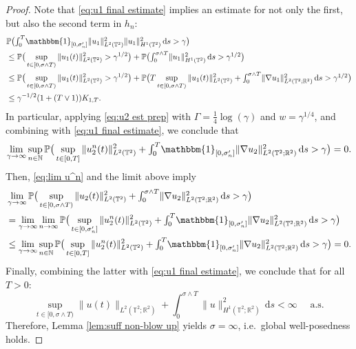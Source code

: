 \documentclass{amsart}
\newcommand{\dd}{\,\mathrm{d}}
\newcommand{\one}{\mathbbm{1}}
\newcommand{\<}{\langle}
\newcommand{\?}{\rangle}
\newcommand{\Tor}{\mathbb{T}}
\renewcommand{\Tor}{\mathbb{T}^2}
\theoremstyle{plain}
\theoremstyle{remark}
\theoremstyle{plain}
\numberwithin{equation}{section}
\def\N{{\mathbb N}}
\def\R{{\mathbb R}}
\renewcommand{\P}{\mathbb{P}}
\begin{document}
\begin{proof}
Note that \eqref{eq:u1 final estimate} implies an estimate for not only the first, but also  the second  term in $h_n$:  
\begin{align*}
&\P\big(\textstyle{\int_0^T}\one_{[0,\sigma_n']}\|u_1\|_{L^2(\Tor)}^2\| u_1\|_{H^1(\Tor )}^2\dd s>\gamma\big)\\
&\leq \P\big(\sup_{t\in[0,\sigma\wedge T)}\|u_1(t)\|_{L^2(\Tor)}^2 >\gamma^{1/2}\big)+\P\big(\textstyle{\int_0^{\sigma\wedge T}}\| u_1\|_{H^1(\Tor)}^2 \dd s>\gamma^{1/2}\big)\\
&\leq \P\big(\sup_{t\in[0,\sigma\wedge T)}\|u_1(t)\|_{L^2(\Tor)}^2 >\gamma^{1/2}\big)+\P\big(T\sup_{t\in[0,\sigma\wedge T)}\|u_1(t)\|_{L^2(\Tor)}^2 +\textstyle{\int_0^{\sigma\wedge T}}\|\nabla u_1\|_{L^2(\Tor;\R^2)}^2\dd s>\gamma^{1/2}\big)\\
&\leq \gamma^{-1/2}(1+(T\vee 1))K_{1,T}.    
\end{align*}  
In particular, applying \eqref{eq:u2 est prep} with $\Gamma=\tfrac14\log(\gamma)$ and $w=\gamma^{1/4}$, and combining with \eqref{eq:u1 final estimate}, we conclude that 
\[
\lim_{\gamma\to\infty}\sup_{n\in\N}\P\big(\sup_{t\in [0,T]} \|u_2^n(t)\|_{L^2(\Tor)}^2 +\textstyle{\int_0^T}\one_{[0,\sigma_n']}\|\nabla u_2\|_{L^2(\Tor;\R^2)}^2\dd s>\gamma\big)=0. 
\]
Then, \eqref{eq:lim u^n} and the limit above imply
\begin{align*}
&\lim_{\gamma\to\infty}\P\big(\sup_{t\in [0,\sigma\wedge T)} \|u_2(t)\|_{L^2(\Tor)}^2 +\textstyle{\int_0^{\sigma\wedge T}}\|\nabla u_2\|_{L^2(\Tor;\R^2)}^2\dd s>\gamma\big)\\
&=\lim_{\gamma\to\infty}\lim_{n\to\infty}\P\big(\sup_{t\in [0,\sigma_n']} \|u_2^n(t)\|_{L^2(\Tor)}^2 +\textstyle{\int_0^T}\one_{[0,\sigma_n']}\|\nabla u_2\|_{L^2(\Tor;\R^2)}^2\dd s>\gamma\big)\\
&\leq \lim_{\gamma\to\infty}\sup_{n\in\N}\P\big(\sup_{t\in [0,T]} \|u_2^n(t)\|_{L^2(\Tor)}^2 +\textstyle{\int_0^T}\one_{[0,\sigma_n']}\|\nabla u_2\|_{L^2(\Tor;\R^2)}^2\dd s>\gamma\big)=0.
\end{align*}  
Finally, combining the latter with \eqref{eq:u1 final estimate}, we conclude that for all  $T>0$:  
  \[
     \sup_{t\in[0,\sigma\wedge T)}\|u(t)\|_{L^2(\Tor;\R^2)}+\textstyle{\int_0^{\sigma\wedge T}}\|u\|_{H^1(\Tor;\R^2)}^2\dd s <\infty \quad {\text{ a.s.}}
  \] 
  Therefore,   Lemma \ref{lem:suff non-blow up} yields   $\sigma=\infty$, i.e.\  global well-posedness holds. 
\end{proof}
\end{document}
